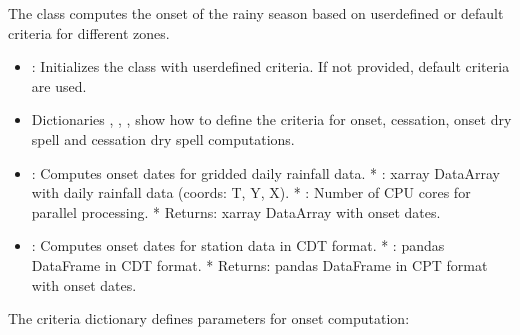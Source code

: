 \documentclass[letterpaper,10pt,english]{sphinxmanual}
\begin{document}
\sphinxAtStartPar
{}

\sphinxAtStartPar
The  class computes the onset of the rainy season based on user\sphinxhyphen{}defined or default criteria for different zones.

\sphinxAtStartPar
{}
\begin{itemize}
\item {} 
\sphinxAtStartPar
{}: Initializes the class with user\sphinxhyphen{}defined criteria. If not provided, default criteria are used.

\item {} 
\sphinxAtStartPar
Dictionaries ,  , ,  show how to define the criteria for onset, cessation, onset dry spell and cessation dry spell computations.

\end{itemize}

\sphinxAtStartPar
{}
\begin{itemize}
\item {} 
\sphinxAtStartPar
{}: Computes onset dates for gridded daily rainfall data.
* : xarray DataArray with daily rainfall data (coords: T, Y, X).
* : Number of CPU cores for parallel processing.
* Returns: xarray DataArray with onset dates.

\item {} 
\sphinxAtStartPar
{}: Computes onset dates for station data in CDT format.
* : pandas DataFrame in CDT format.
* Returns: pandas DataFrame in CPT format with onset dates.

\end{itemize}

\sphinxAtStartPar
{}

\sphinxAtStartPar
The criteria dictionary defines parameters for onset computation:
\end{document}
